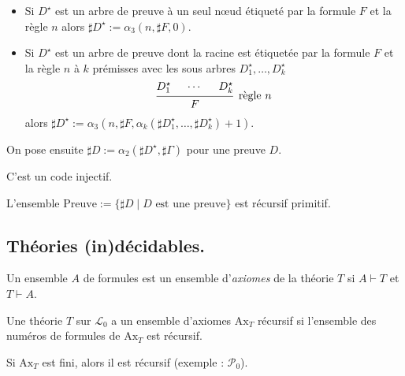 \documentclass[./main]{subfiles}
\begin{document}
 \begin{defn}
   \begin{itemize}
     \item Si $D^\star$ est un arbre de preuve à un seul nœud étiqueté par la formule  $F$ et la règle $n$ alors $\sharp D^\star := \alpha_3(n, \sharp F, 0)$.
     \item Si $D^\star$ est un arbre de preuve dont la racine est étiquetée par la formule  $F$ et la règle $n$ à $k$ prémisses avec les sous arbres $D_1^\star, \ldots, D_k^\star$ 
       \[
       \begin{prooftree}
         \hypo{D_1^\star} \hypo{\cdots} \hypo{D_k^\star}
         \infer 3[\text{règle $n$}]{F}
       \end{prooftree}
       \]
       alors $\sharp D^\star := \alpha_3(n, \sharp F, \alpha_k(\sharp D_1^\star, \ldots, \sharp D_k^\star) + 1)$.
   \end{itemize}

   On pose ensuite $\sharp D := \alpha_2(\sharp D^\star, \sharp \Gamma)$ pour une preuve $D$.
 \end{defn}

 \begin{lem}
   C'est un code injectif.
 \end{lem}
 \begin{lem}
   L'ensemble $\mathrm{Preuve} := \{\sharp D  \mid D \text{ est une preuve}\}$ est récursif primitif.
 \end{lem}

 \subsection{Théories (in)décidables.}

 \begin{defn}
   Un ensemble $A$ de formules est un ensemble d'\textit{axiomes} de la théorie $T$ si $A \vdash T$ et $T \vdash A$.
 \end{defn}

 \begin{defn}
   Une théorie $T$ sur $\mathcal{L}_0$ a un ensemble d'axiomes $\mathrm{Ax}_T$ récursif si l'ensemble des numéros de formules de $\mathrm{Ax}_T$ est récursif.
 \end{defn}
 \begin{rmk}
   Si $\mathrm{Ax}_T$ est fini, alors il est récursif (exemple : $\mathcal{P}_0$).
 \end{rmk}
\end{document}
